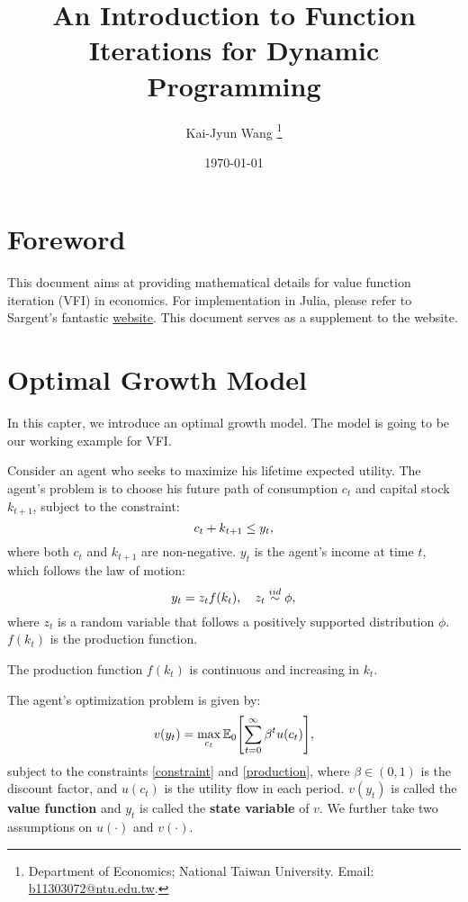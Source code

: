 \documentclass[12pt]{article}
\title{
    An Introduction to Function Iterations for Dynamic Programming 
    }
\author{%
   Kai-Jyun Wang
   \thanks{Department of Economics; National Taiwan University. 
   Email: \url{b11303072@ntu.edu.tw}.}
}
\date{\today}
\begin{document}

\maketitle

\section*{Foreword}
This document aims at providing mathematical details for value 
function iteration (VFI) in economics. For implementation in Julia, 
please refer to Sargent's fantastic 
\href{https://julia.quantecon.org/dynamic_programming/optgrowth.html}
{website}. This document serves as a supplement to the website.

\tableofcontents

\section{Optimal Growth Model}
In this capter, we introduce an optimal growth model. The model is 
going to be our working example for VFI. 

Consider an agent who seeks to maximize his lifetime expected utility. 
The agent's problem is to choose his future path of consumption $c_t$ 
and capital stock $k_{t+1}$, subject to the constraint: 
\begin{equation}\eqlab{constraint}
    c_t + k_{t+1} \leq y_t,
\end{equation} 
where both $c_t$ and $k_{t+1}$ are non-negative. $y_t$ is the agent's 
income at time $t$, which follows the law of motion: 
\begin{equation}\eqlab{production}
    y_t = z_t f(k_t),\quad z_t \overset{iid}{\sim} \phi,
\end{equation}
where $z_t$ is a random variable that follows a positively supported 
distribution $\phi$. $f(k_t)$ is the production function. 

\begin{assumption}
    The production function $f(k_t)$ is continuous and increasing in 
    $k_t$.
\end{assumption}

The agent's optimization problem is given by: 
\begin{equation}
    v(y_t) = \max_{c_t} \E_0\sbrc{\sum_{t=0}^{\infty} \beta^t u(c_t)},
\end{equation}
subject to the constraints \eqref{constraint} and \eqref{production},
where $\beta \in (0, 1)$ is the discount factor, and $u(c_t)$ is the 
utility flow in each period. $v(y_t)$ is called the \textbf{value 
function} and $y_t$ is called the \textbf{state variable} of $v$. We 
further take two assumptions on $u(\cdot)$ and $v(\cdot)$.
\end{document}
